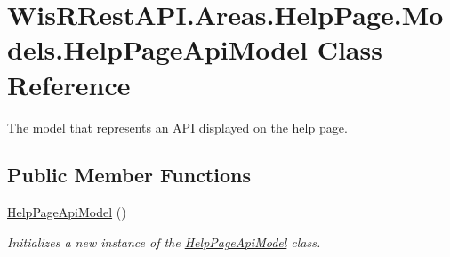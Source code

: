 \hypertarget{class_wis_r_rest_a_p_i_1_1_areas_1_1_help_page_1_1_models_1_1_help_page_api_model}{}\section{Wis\+R\+Rest\+A\+P\+I.\+Areas.\+Help\+Page.\+Models.\+Help\+Page\+Api\+Model Class Reference}
\label{class_wis_r_rest_a_p_i_1_1_areas_1_1_help_page_1_1_models_1_1_help_page_api_model}


The model that represents an A\+P\+I displayed on the help page.  


\subsection*{Public Member Functions}
\begin{DoxyCompactItemize}
\item 
\hyperlink{class_wis_r_rest_a_p_i_1_1_areas_1_1_help_page_1_1_models_1_1_help_page_api_model_a6b8b0e542cb39af4302d2b8f5211d902}{Help\+Page\+Api\+Model} ()
\begin{DoxyCompactList}\small\item\em Initializes a new instance of the \hyperlink{class_wis_r_rest_a_p_i_1_1_areas_1_1_help_page_1_1_models_1_1_help_page_api_model}{Help\+Page\+Api\+Model} class. \end{DoxyCompactList}\end{DoxyCompactItemize}
